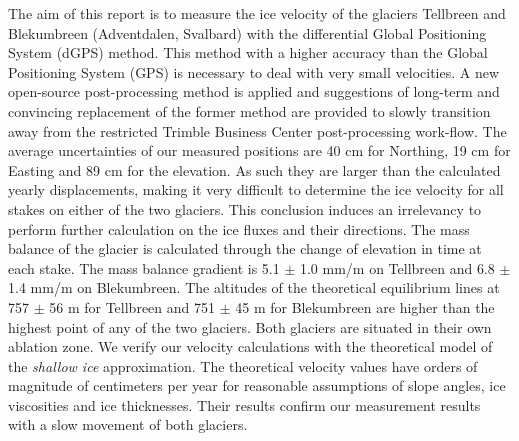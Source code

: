 The aim of this report is to measure the ice velocity of the glaciers Tellbreen and Blekumbreen (Adventdalen, Svalbard) with the differential Global Positioning System (dGPS) method. This method with a higher accuracy than the Global Positioning System (GPS) is necessary to deal with very small velocities.
A new open-source post-processing method is applied and suggestions of long-term and convincing replacement of the former method are provided to slowly transition away from the restricted Trimble Business Center post-processing work-flow.
The average uncertainties of our measured positions are 40 cm for Northing, 19 cm for Easting and 89 cm for the elevation.
As such they are larger than the calculated yearly displacements, making it very difficult to determine the ice velocity for all stakes on either of the two glaciers. This conclusion induces an irrelevancy to perform further calculation on the ice fluxes and their directions.
The mass balance of the glacier is calculated through the change of elevation in time at each stake. 
The mass balance gradient is 5.1 $\pm$ 1.0 mm/m on Tellbreen and 6.8 $\pm$ 1.4 mm/m on Blekumbreen.
The altitudes of the theoretical equilibrium lines at 757 $\pm$ 56 m for Tellbreen and 751 $\pm$ 45 m for Blekumbreen are higher than the highest point of any of the two glaciers. Both glaciers are situated in their own ablation zone.
We verify our velocity calculations with the theoretical model of the \textit{shallow ice} approximation. The theoretical velocity values have orders of magnitude of centimeters per year for reasonable assumptions of slope angles, ice viscosities and ice thicknesses. Their results confirm our measurement results with a slow movement of both glaciers.